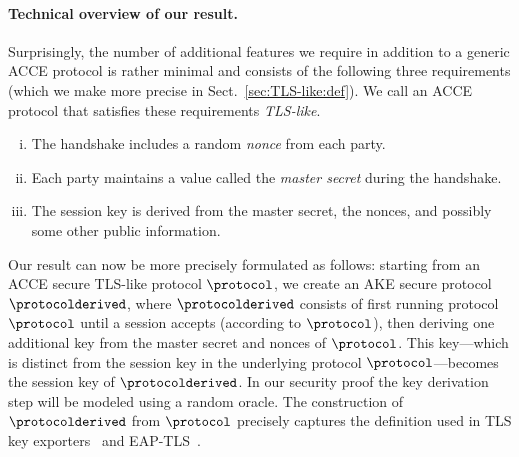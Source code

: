 %
\paragraph{Technical overview of our result.}
Surprisingly,
the number of additional features we require in addition to a generic ACCE protocol is rather minimal
and consists of the following three requirements 
(which we make more precise in Sect.~\ref{sec:TLS-like:def}).
We call an ACCE protocol that satisfies these requirements \emph{TLS-like}.
%
%
%
%
%
\begin{enumerate}[(i)]
	\item The handshake includes a random \emph{nonce} from each party.
	\item Each party maintains a value called the \emph{master secret} during the handshake.
	\item The session key is derived from the master secret, the nonces, and possibly some other public information.
\end{enumerate}


Our result can now be more precisely formulated as follows:
starting from an ACCE secure TLS-like protocol $\protocol$,
we create an AKE secure protocol $\protocolderived$,
where $\protocolderived$ consists of first running protocol $\protocol$ until a session accepts
(according to $\protocol$),
then deriving one additional key from the master secret and nonces of $\protocol$.
This key---which is distinct from the session key in the underlying protocol $\protocol$---becomes the session key of $\protocolderived$.
In our security proof the key derivation step will be modeled using a random oracle.
The construction of $\protocolderived$ from $\protocol$ precisely captures the definition used in TLS key exporters~\cite{IETF:RFC:5705:TLS-key-exporters}
and EAP-TLS~\cite{IETF:2008:RFC5216-EAP-TLS}.


